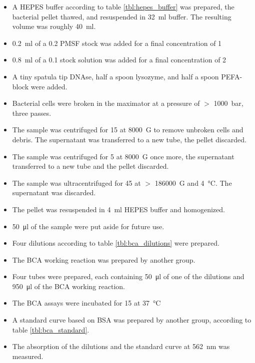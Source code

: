 \begin{itemize}
	\item A HEPES buffer according to table \ref{tbl:hepes_buffer} was
		prepared, the bacterial pellet thawed, and resuspended in
		\SI{32}{\ml} buffer. The resulting volume was roughly
		\SI{40}{\ml}.
	\item \SI{0.2}{\ml} of a \SI{0.2}{\Molar} PMSF stock was added for a
		final concentration of \SI{1}{\milli\Molar}
	\item \SI{0.8}{\ml} of a \SI{0.1}{\Molar}  stock solution was
		added for a final concentration of \SI{2}{\milli\Molar}
	\item A tiny spatula tip DNAse, half a spoon lysozyme, and half a spoon
		PEFA-block were added.
	\item Bacterial cells were broken in the maximator at a pressure of $>$
		\SI{1000}{\bar}, three passes.
	\item The sample was centrifuged for \SI{15}{\min} at \SI{8000}{G} to
		remove unbroken cells and debris. The supernatant was
		transferred to a new tube, the pellet discarded. 
	\item The sample was centrifuged for \SI{5}{\min} at \SI{8000}{G} once
		more, the supernatant transferred to a new tube and the pellet
		discarded.
	\item The sample was ultracentrifuged for \SI{45}{\min} at $>$
		\SI{186000}{G} and \SI{4}{\celsius}. The supernatant was
		discarded.
	\item The pellet was resuspended in \SI{4}{\ml} HEPES buffer and
		homogenized.
	\item \SI{50}{\ul} of the sample were put aside for future use.
	\item Four dilutions according to table \ref{tbl:bca_dilutions} were
		prepared.
	\item The BCA working reaction was prepared by another group.
	\item Four tubes were prepared, each containing \SI{50}{\ul} of one of
		the dilutions and \SI{950}{\ul} of the BCA working reaction.
	\item The BCA assays were incubated for \SI{15}{\min} at \SI{37}{\celsius}
	\item A standard curve based on BSA was prepared by another group,
		according to table \ref{tbl:bca_standard}.
	\item The absorption of the dilutions and the standard curve at
		\SI{562}{\nm} was measured. %
\end{itemize}

